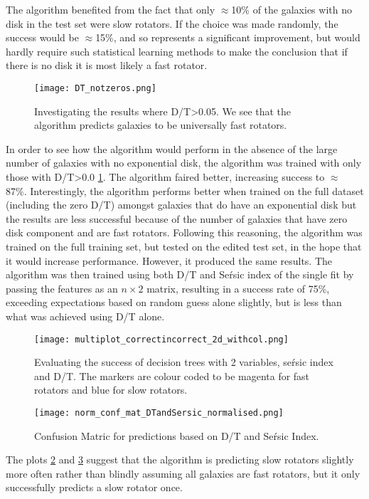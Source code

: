 The algorithm benefited from the fact that only $\approx$10\% of the galaxies with no disk in the test set were slow rotators. If the choice was made randomly, the success would be $\approx$15\%, and so represents a significant improvement, but would hardly require such statistical learning methods to make the conclusion that if there is no disk it is most likely a fast rotator.
\begin{figure}[h!]
	\centering
	\texttt{[image: DT\_notzeros.png]}
	\caption{Investigating the results where D/T>0.05. We see that the algorithm predicts galaxies to be universally fast rotators.
	}
	\label{fig:notzerodt}
\end{figure}
In order to see how the algorithm would perform in the absence of the large number of galaxies with no exponential disk, the algorithm was trained with only those with D/T>0.0 \ref{fig:notzerodt}. The algorithm faired better, increasing success to $\approx$ 87\%.
Interestingly, the algorithm performs better when trained on the full dataset (including the zero D/T) amongst galaxies that do have an exponential disk but the results are less successful because of the number of galaxies that have zero disk component and are fast rotators. Following this reasoning, the algorithm was trained on the full training set, but tested on the edited test set, in the hope that it would increase performance. However, it produced the same results.
The algorithm was then trained using both D/T and Se\'rsic index of the single fit by passing the features as an $n\times 2$ matrix, resulting in a success rate of 75\%, exceeding expectations based on random guess alone slightly, but is less than what was achieved using D/T alone. 
\begin{figure}[h!]
	\centering
	\texttt{[image: multiplot\_correctincorrect\_2d\_withcol.png]}
	\caption{Evaluating the success of decision trees with 2 variables, se\'rsic index and D/T. The markers are colour coded to be magenta for fast rotators and blue for slow rotators.
	}
	\label{fig:correctvsincorrect}
\end{figure}
\begin{figure}[h!]
	\centering
	\texttt{[image: norm\_conf\_mat\_DTandSersic\_normalised.png]}
	\caption{Confusion Matric for predictions based on D/T and Se\'rsic Index.
	}
	\label{fig:confmatDT}
\end{figure}
The plots \ref{fig:correctvsincorrect} and \ref{fig:confmatDT} suggest that the algorithm is predicting slow rotators slightly more often rather than blindly assuming all galaxies are fast rotators, but it only successfully predicts a slow rotator once.
